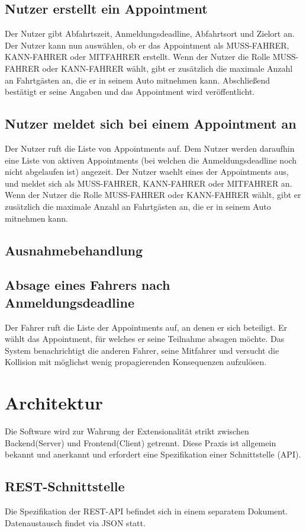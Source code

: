 \documentclass[11pt,a4paper]{article}
\begin{document}
\subsection*{Nutzer erstellt ein Appointment}
Der Nutzer gibt Abfahrtszeit, Anmeldungsdeadline, Abfahrtsort und Zielort an. Der Nutzer kann nun auswählen, ob er das Appointment als MUSS-FAHRER, KANN-FAHRER oder MITFAHRER erstellt. Wenn der Nutzer die Rolle MUSS-FAHRER oder KANN-FAHRER wählt, gibt er zusätzlich die maximale Anzahl an Fahrtgästen an, die er in seinem Auto mitnehmen kann. Abschließend bestätigt er seine Angaben und das Appointment wird veröffentlicht.

\subsection*{Nutzer meldet sich bei einem Appointment an}
Der Nutzer ruft die Liste von Appointments auf. Dem Nutzer werden daraufhin eine Liste von aktiven Appointments (bei welchen die Anmeldungsdeadline noch nicht abgelaufen ist) angezeit. Der Nutzer waehlt eines der Appointments aus, und meldet sich als MUSS-FAHRER, KANN-FAHRER oder MITFAHRER an. Wenn der Nutzer die Rolle MUSS-FAHRER oder KANN-FAHRER wählt, gibt er zusätzlich die maximale Anzahl an Fahrtgästen an, die er in seinem Auto mitnehmen kann.

\subsection{Ausnahmebehandlung}
\subsection*{Absage eines Fahrers nach Anmeldungsdeadline}
Der Fahrer ruft die Liste der Appointments auf, an denen er sich beteiligt. Er wählt das Appointment, für welches er seine Teilnahme absagen möchte. Das System benachrichtigt die anderen Fahrer, seine Mitfahrer und versucht die Kollision mit möglichst wenig propagierenden Konsequenzen aufzulösen.

\section{Architektur}
Die Software wird zur Wahrung der Extensionalität strikt zwischen Backend(Server) und Frontend(Client) getrennt. Diese Praxis ist allgemein bekannt und anerkannt und erfordert eine Spezifikation einer Schnittstelle (API).
\subsection{REST-Schnittstelle}
Die Spezifikation der REST-API befindet sich in einem separatem Dokument.
Datenaustausch findet via JSON statt.
\end{document}
